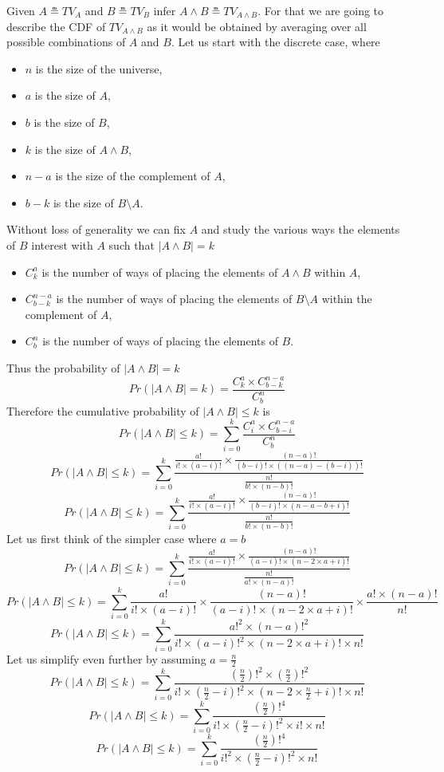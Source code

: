 \documentclass[]{article}
\begin{document}
Given $A \measeq TV_A$ and $B \measeq TV_B$ infer $A \land B \measeq
TV_{A\land B}$.  For that we are going to describe the CDF of
$TV_{A\land B}$ as it would be obtained by averaging over all possible
combinations of $A$ and $B$.
Let us start with the discrete case, where
\begin{itemize}
\item $n$ is the size of the universe,
\item $a$ is the size of $A$,
\item $b$ is the size of $B$,
\item $k$ is the size of $A \land B$,
\item $n-a$ is the size of the complement of $A$,
\item $b-k$ is the size of $B\setminus A$.
\end{itemize}
Without loss of generality we can fix $A$ and study the various ways
the elements of $B$ interest with $A$ such that $|A \land B|=k$
\begin{itemize}
\item $C_k^a$ is the number of ways of placing the elements of
  $A \land B$ within $A$,
\item $C_{b-k}^{n-a}$ is the number of ways of placing the
  elements of $B\setminus A$ within the complement of $A$,
\item $C_b^n$ is the number of ways of placing the elements of $B$.
\end{itemize}
Thus the probability of $|A\land B|=k$
$$Pr(|A\land B|=k) = \frac{C_k^a \times C_{b-k}^{n-a}}{C_b^n}$$
Therefore the cumulative probability of $|A\land B|\leq k$ is
$$Pr(|A\land B|\leq k) = \sum_{i=0}^k \frac{C_i^a \times
  C_{b-i}^{n-a}}{C_b^n}$$
$$Pr(|A\land B|\leq k) = \sum_{i=0}^k \frac{\frac{a!}{i!\times (a-i)!} \times
  \frac{(n-a)!}{(b-i)!\times ((n-a) - (b-i))!}}{\frac{n!}{b!\times (n-b)!}}$$
$$Pr(|A\land B|\leq k) = \sum_{i=0}^k \frac{\frac{a!}{i!\times (a-i)!} \times
  \frac{(n-a)!}{(b-i)!\times (n-a-b+i)!}}{\frac{n!}{b!\times (n-b)!}}$$
Let us first think of the simpler case where $a=b$
$$Pr(|A\land B|\leq k) = \sum_{i=0}^k \frac{\frac{a!}{i!\times (a-i)!} \times
  \frac{(n-a)!}{(a-i)!\times (n-2\times a+i)!}}{\frac{n!}{a!\times (n-a)!}}$$
$$Pr(|A\land B|\leq k) = \sum_{i=0}^k
  \frac{a!}{i!\times (a-i)!} \times \frac{(n-a)!}{(a-i)!\times
      (n-2\times a+i)!} \times \frac{a!\times (n-a)!}{n!}$$
$$Pr(|A\land B|\leq k) = \sum_{i=0}^k
  \frac{a!^2 \times (n-a)!^2}{i! \times (a-i)!^2 \times
    (n-2\times a+i)! \times n!}$$
Let us simplify even further by assuming $a=\frac{n}{2}$
$$Pr(|A\land B|\leq k) = \sum_{i=0}^k
  \frac{\left (\frac{n}{2}\right )!^2 \times \left (\frac{n}{2} \right
    )!^2}{i! \times \left (\frac{n}{2}-i \right )!^2 \times
    \left (n-2\times \frac{n}{2}+i \right )! \times n!}$$
$$Pr(|A\land B|\leq k) = \sum_{i=0}^k
  \frac{\left (\frac{n}{2}\right )!^4}{i! \times \left (\frac{n}{2}-i \right )!^2 \times
    i! \times n!}$$
$$Pr(|A\land B|\leq k) = \sum_{i=0}^k
  \frac{\left (\frac{n}{2}\right )!^4}{i!^2 \times \left
    (\frac{n}{2}-i \right )!^2 \times n!}$$
\end{document}
